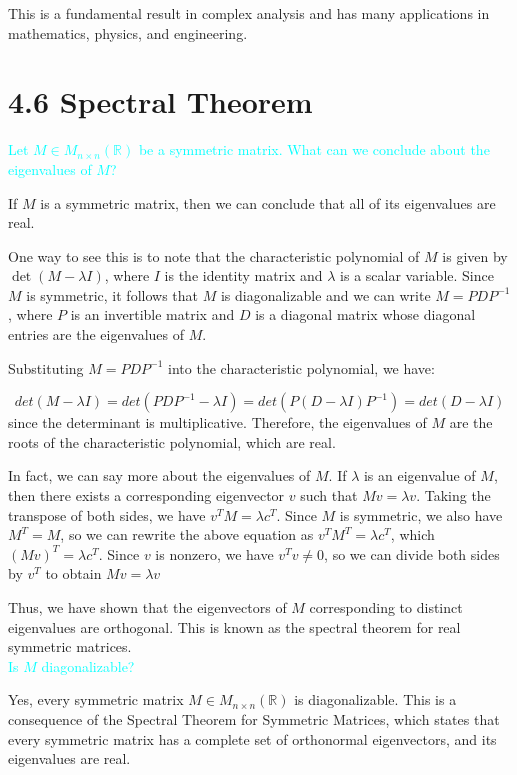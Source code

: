 \documentclass[fontsize=12pt]{scrartcl}
\begin{document}
\noindent
This is a fundamental result in complex analysis and has many applications in mathematics, physics, and engineering.

\newpage


\section{4.6 Spectral Theorem}

\bigskip

\noindent
\textcolor{cyan}{Let $M \in M_{n\times n}(\mathbb{R})$ be a symmetric matrix. What can we conclude about the eigenvalues of $M$?}

\noindent
If $M$ is a symmetric matrix, then we can conclude that all of its eigenvalues are real.

\noindent
One way to see this is to note that the characteristic polynomial of $M$ is given by $\det(M - \lambda I)$, where $I$ is the identity matrix and $\lambda$ is a scalar variable. Since $M$ is symmetric, it follows that $M$ is diagonalizable and we can write $M = PDP^{-1}$, where $P$ is an invertible matrix and $D$ is a diagonal matrix whose diagonal entries are the eigenvalues of $M$.

\noindent
Substituting $M = PDP^{-1}$ into the characteristic polynomial, we have:

$$det(M-\lambda I) = det(PDP^{-1} - \lambda I) = det(P(D-\lambda I )P^{-1}) = det(D - \lambda I) $$
\noindent
since the determinant is multiplicative. Therefore, the eigenvalues of $M$ are the roots of the characteristic polynomial, which are real.

\noindent
In fact, we can say more about the eigenvalues of $M$. If $\lambda$ is an eigenvalue of $M$, then there exists a corresponding eigenvector $v$ such that $Mv = \lambda v$. Taking the transpose of both sides, we have $v^T M = \lambda c^T $. Since $M$ is symmetric, we also have $M^T = M$, so we can rewrite the above equation as $v^T M^T = \lambda c^T $, which $(Mv)^T = \lambda c^T $. Since $v$ is nonzero, we have $v^T v \neq 0$, so we can divide both sides by $v^T$ to obtain $Mv = \lambda v $

\noindent
Thus, we have shown that the eigenvectors of $M$ corresponding to distinct eigenvalues are orthogonal. This is known as the spectral theorem for real symmetric matrices.
\\

\noindent
\textcolor{cyan}{Is $M$ diagonalizable?}

\noindent
Yes, every symmetric matrix $M \in M_{n\times n}(\mathbb{R})$ is diagonalizable. This is a consequence of the Spectral Theorem for Symmetric Matrices, which states that every symmetric matrix has a complete set of orthonormal eigenvectors, and its eigenvalues are real.
\end{document}
